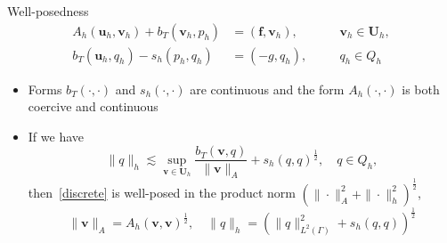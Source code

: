 \documentclass[svgnames]{beamer} %
\newcommand{\blf}{\mathbf f}
\newcommand{\bu}{\mathbf u}
\newcommand{\bU}{\mathbf U}
\newcommand{\bv}{\mathbf v}
\begin{document}
	\begin{frame}{Well-posedness}
		\setcounter{equation}{1}		
		\begin{equation}\label{discrete}
		\begin{aligned}
			A_h(\bu_h,\bv_h) + b_T(\bv_h,p_h) & =(\blf,\bv_h), &\quad &\bv_h \in \bU_h,\\
			b_T(\bu_h,q_h)-s_h(p_h,q_h) & = (-g,q_h), &\quad &q_h \in Q_h
		\end{aligned}
		\end{equation}
		\begin{itemize}
			\item Forms $b_T(\cdot,\cdot)$ and $s_h(\cdot,\cdot)$ are continuous and
			the form $A_h(\cdot, \cdot)$ is both coercive and continuous
			\item If we have
			\begin{equation}\label{LBB}
				\|q\|_h \lesssim \sup_{\bv\in\bU_h}\frac{b_T(\bv,q)}{\|\bv\|_A} +s_h(q,q)^{\frac12}, \quad q \in Q_h, \tag{LBB}
			\end{equation}
			then~\eqref{discrete} is well-posed  in the product norm $(\|\cdot\|_A^2+\|\cdot\|_h^2)^{\frac12}$,
			\begin{equation*}
				\|\bv\|_A=A_h(\bv, \bv)^{\frac12},\quad\|q\|_h=\left(\|q\|^2_{L^2(\Gamma)}+s_h(q,q)\right)^\frac12
			\end{equation*}
		\end{itemize}
	\end{frame}
	
\end{document}
